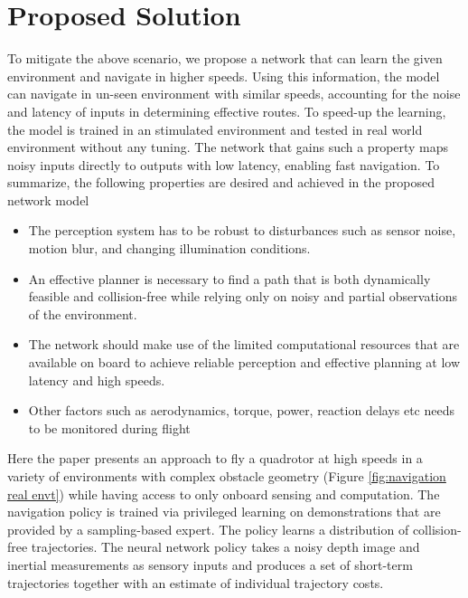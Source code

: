 \section{Proposed Solution}
To mitigate the above scenario, we propose a network that can learn the given environment and navigate in higher speeds. Using this information, the model can navigate in un-seen environment with similar speeds, accounting for the noise and latency of inputs in determining effective routes. To speed-up the learning, the model is trained in an stimulated environment and tested in real world environment without any tuning. The network that gains such a property maps noisy inputs directly to outputs with low latency, enabling fast navigation. To summarize, the following properties are desired and achieved in the proposed network model

\begin{itemize}
	\item The perception system has to be robust to disturbances such
as sensor noise, motion blur, and changing illumination
conditions.
	\item An effective planner is necessary to find a path that is both
dynamically feasible and collision-free while relying only on
 noisy and partial observations of the environment.
	\item The network should make use of the limited computational resources that are available on
board to achieve reliable perception and
effective planning at low latency and high speeds.
	\item Other factors such as aerodynamics, torque, power, reaction
delays etc needs to be monitored during flight
\end{itemize}

Here the paper presents an approach to fly a quadrotor at high speeds in
a variety of environments with complex obstacle geometry (Figure \ref{fig:navigation real envt}) while having access to only onboard sensing and computation. The navigation policy is trained via privileged learning on
demonstrations that are provided by a sampling-based expert. The policy learns a distribution of collision-free trajectories. The neural network policy takes a noisy depth image and inertial measurements as sensory inputs and produces a set of short-term trajectories together with an estimate of
individual trajectory costs.